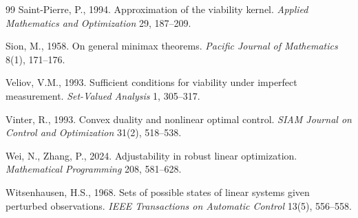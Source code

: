 \documentclass[11pt,a4paper]{article}
\theoremstyle{plain}
\theoremstyle{definition}
\theoremstyle{remark}
\begin{document}
\begin{thebibliography}{99}
 Saint-Pierre, P., 1994. Approximation of the viability kernel. \emph{Applied Mathematics and Optimization} 29, 187--209.

 Sion, M., 1958. On general minimax theorems. \emph{Pacific Journal of Mathematics} 8(1), 171--176.

 Veliov, V.M., 1993. Sufficient conditions for viability under imperfect measurement. \emph{Set-Valued Analysis} 1, 305--317.

 Vinter, R., 1993. Convex duality and nonlinear optimal control. \emph{SIAM Journal on Control and Optimization} 31(2), 518--538.

 Wei, N., Zhang, P., 2024. Adjustability in robust linear optimization. \emph{Mathematical Programming} 208, 581--628.

 Witsenhausen, H.S., 1968. Sets of possible states of linear systems given perturbed observations. \emph{IEEE Transactions on Automatic Control} 13(5), 556--558.

\end{thebibliography}
\end{document}

